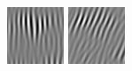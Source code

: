 \begin{figure}
\begin{center}
  \includegraphics[width=\columnwidth/9]{ch4/figures/imag_1_0.jpg}
  \includegraphics[width=\columnwidth/9]{ch4/figures/imag_1_1.jpg}

\end{center}
\end{figure}
